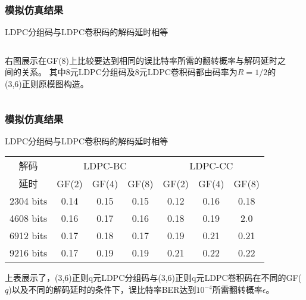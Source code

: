 \documentclass{beamer}
\begin{document}
\begin{frame}[shrink]
	\frametitle{模拟仿真结果}
		\begin{block}{LDPC分组码与LDPC卷积码的解码延时相等}
		\begin{columns}
		\begin{column}{0.4\textwidth}
		右图展示在GF($8$)上比较要达到相同的误比特率所需的翻转概率与解码延时之间的关系。
其中8元LDPC分组码及8元LDPC卷积码都由码率为$R=1/2$的(3,6)正则原模图构造。
		\end{column}
		\begin{column}{0.6\textwidth}
		\begin{center}
\end{center}
		\end{column}
		\end{columns}
		\end{block}
\end{frame}
\begin{frame}[shrink]
	\frametitle{模拟仿真结果}
		\begin{block}{LDPC分组码与LDPC卷积码的解码延时相等}
		\begin{center}
		\begin{tabular}{|c|c|c|c|c|c|c|}
 \hline
解码 & \multicolumn{3}{|c|}{LDPC-BC} & \multicolumn{3}{|c|}{LDPC-CC} \\ \cline{2-7}
延时 & GF(2) & GF(4) & GF(8) & GF(2) & GF(4) & GF(8) \\ \hline
2304 bits & 0.14 & 0.15 & 0.15 & 0.12 & 0.16 & 0.18\\ \hline
4608 bits & 0.16 & 0.17 & 0.16 & 0.18 & 0.19 & 2.0\\ \hline
6912 bits & 0.17 & 0.18 & 0.17 & 0.19 & 0.21 & 0.21\\ \hline
9216 bits & 0.17 & 0.19 & 0.19 & 0.21 & 0.22 & 0.22\\ \hline
\end{tabular}
\end{center}
上表展示了，(3,6)正则q元LDPC分组码与(3,6)正则q元LDPC卷积码在不同的GF($q$)以及不同的解码延时的条件下，误比特率BER达到$10^{-4}$所需翻转概率$\epsilon$。
		\end{block}
\end{frame}
\end{document}
